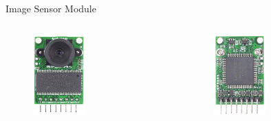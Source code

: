 \begin{frame}{Image Sensor Module}
\begin{columns}[t]
\begin{column}[t]{0.4\textwidth}
\begin{columns}[t]
\begin{column}[t]{0.5\textwidth}
\begin{figure}[!ht]
\begin{center}
                            \includegraphics[width=2cm]{figures/arducam-top}
                        \end{center}
                    \end{figure}
                \end{column}
                \begin{column}[t]{0.5\textwidth}
                    \begin{figure}[!ht]
                        \begin{center}
                            \includegraphics[width=2cm]{figures/arducam-bottom}
                        \end{center}
                    \end{figure}
                \end{column}
            \end{columns}
        \end{column}
    \end{columns}

\end{frame}


